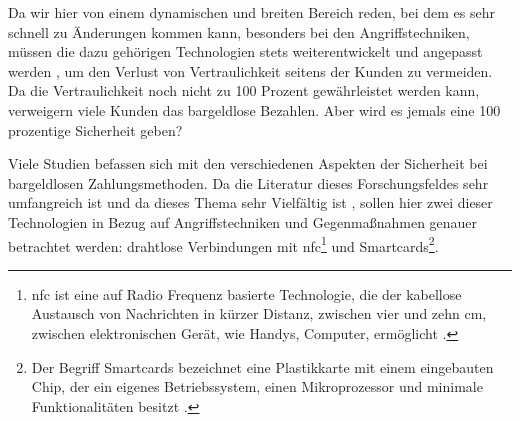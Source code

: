 Da wir hier von einem dynamischen und breiten Bereich reden, bei dem es sehr schnell zu Änderungen kommen kann, 
besonders bei den Angriffstechniken, müssen die dazu gehörigen Technologien stets weiterentwickelt und angepasst
werden \cite{refip:NYRS}, um den Verlust von Vertraulichkeit seitens der Kunden zu vermeiden. Da die Vertraulichkeit noch
nicht zu 100 Prozent gewährleistet werden kann, verweigern viele Kunden das bargeldlose Bezahlen. Aber
wird es jemals eine 100 prozentige Sicherheit geben?

Viele Studien befassen sich mit den verschiedenen Aspekten der Sicherheit bei bargeldlosen Zahlungsmethoden.
Da die Literatur dieses Forschungsfeldes sehr umfangreich ist und da dieses Thema sehr Vielfältig ist 
\cite{refip:GMPS}, sollen hier zwei dieser Technologien in Bezug auf Angriffstechniken und Gegenmaßnahmen 
genauer betrachtet werden: drahtlose Verbindungen mit \acrfull{nfc}\footnote{\acrfull{nfc} ist eine auf Radio Frequenz
basierte Technologie, die der kabellose Austausch von Nachrichten in kürzer Distanz, zwischen vier und zehn cm, 
zwischen elektronischen Gerät, wie Handys, Computer, ermöglicht \cite{refart:NFNK}.} und Smartcards\footnote{Der
Begriff Smartcards bezeichnet eine Plastikkarte mit einem eingebauten Chip, der ein eigenes Betriebssystem, 
einen Mikroprozessor und minimale Funktionalitäten besitzt \cite{refip:JFSB}.}.



